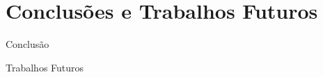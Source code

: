 \section{Conclusões e Trabalhos Futuros}
\begin{frame}{Conclusão}

\end{frame}

\begin{frame}{Trabalhos Futuros}

\end{frame}